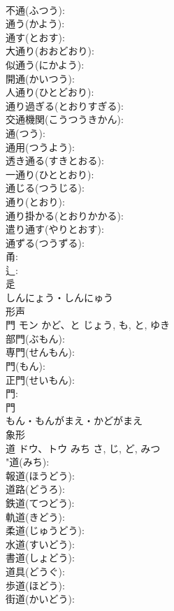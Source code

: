 \documentclass[8pt]{extreport}
\begin{document}
\begin{CJK}{UTF8}{min}
\\	不通(ふつう): 
\\	通う(かよう): 
\\	通す(とおす): 
\\	大通り(おおどおり): 
\\	似通う(にかよう): 
\\	開通(かいつう): 
\\	人通り(ひとどおり): 
\\	通り過ぎる(とおりすぎる): 
\\	交通機関(こうつうきかん): 
\\	通(つう): 
\\	通用(つうよう): 
\\	透き通る(すきとおる): 
\\	一通り(ひととおり): 
\\	通じる(つうじる): 
\\	通り(とおり): 
\\	通り掛かる(とおりかかる): 
\\	遣り通す(やりとおす): 
\\	通ずる(つうずる): 
\\	甬: 
\\	辶: 
\\	辵	
\\	しんにょう・しんにゅう	
\\	形声 
\\	門	モン	かど、と	じょう, も, と, ゆき	
\\	部門(ぶもん): 
\\	専門(せんもん): 
\\	門(もん): 
\\	正門(せいもん): 
\\	門: 
\\	門	
\\	もん・もんがまえ・かどがまえ	
\\	象形 
\\	道	ドウ、トウ	みち	さ, じ, ど, みつ	
\\	"道(みち): 
\\	報道(ほうどう): 
\\	道路(どうろ): 
\\	鉄道(てつどう): 
\\	軌道(きどう): 
\\	柔道(じゅうどう): 
\\	水道(すいどう): 
\\	書道(しょどう): 
\\	道具(どうぐ): 
\\	歩道(ほどう): 
\\	街道(かいどう): 

\end{CJK}
\end{document}
